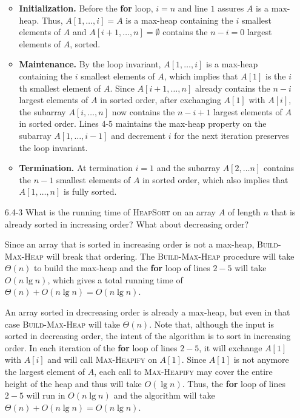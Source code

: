\documentclass{report}
\makeatletter
\renewenvironment{framed}{%
 \def\FrameCommand##1{\hskip\@totalleftmargin
 \fboxsep=\FrameSep\fbox{##1}}%
 \MakeFramed {\advance\hsize-\width
   \@totalleftmargin\z@ \linewidth\hsize
   \@setminipage}}%
 {\par\unskip\endMakeFramed}
\makeatother
\begin{document}
\begin{enumerate}
\begin{framed}
\begin{itemize}
  \item \textbf{Initialization.} Before the \textbf{for} loop, $i = n$ and line
    $1$ assures $A$ is a max-heap. Thus, $A[1, \dots, i] = A$ is a max-heap
    containing the $i$ smallest elements of $A$ and
    $A[i + 1, \dots, n] = \emptyset$ contains the $n - i = 0$ largest elements
    of $A$, sorted.
  \item \textbf{Maintenance.} By the loop invariant, $A[1, \dots, i]$ is
    a max-heap containing the $i$ smallest elements of $A$, which implies that
    $A[1]$ is the $i$th smallest element of $A$. Since $A[i + 1, \dots, n]$
    already contains the $n - i$ largest elements of $A$ in sorted order, after
    exchanging $A[1]$ with $A[i]$, the subarray $A[i, \dots, n]$ now contains
    the $n - i + 1$ largest elements of $A$ in sorted order. Lines 4-5 maintains
    the max-heap property on the subarray $A[1, \dots, i - 1]$ and decrement $i$
    for the next iteration preserves the loop invariant.
  \item \textbf{Termination.} At termination $i = 1$ and the subarray
    $A[2, \dots n]$ contains the $n - 1$ smallest elements of $A$ in sorted
    order, which also implies that $A[1, \dots, n]$ is fully sorted.
\end{itemize}
\end{framed}

\newpage

\item[6.4-3]{What is the running time of \textsc{HeapSort} on an array $A$ of
length $n$ that is already sorted in increasing order? What about decreasing
order?}

\begin{framed}
Since an array that is sorted in increasing order is not a max-heap,
\textsc{Build-Max-Heap} will break that ordering. The \textsc{Build-Max-Heap}
procedure will take $\Theta(n)$ to build the max-heap and the \textbf{for} loop
of lines $2{-}5$ will take $O(n \lg n)$, which gives a total running time of
$\Theta(n) + O(n \lg n) = O(n \lg n)$.

An array sorted in drecreasing order is already a max-heap, but even in that
case \textsc{Build-Max-Heap} will take $\Theta(n)$. Note that, although the
input is sorted in decreasing order, the intent of the algorithm is to sort in
increasing order. In each iteration of the \textbf{for} loop of lines $2{-}5$,
it will exchange $A[1]$ with $A[i]$ and will call \textsc{Max-Heapify} on
$A[1]$. Since $A[1]$ is not anymore the largest element of $A$, each call to
\textsc{Max-Heapify} may cover the entire height of the heap and thus will take
$O(\lg n)$. Thus, the \textbf{for} loop of lines $2{-}5$ will run in
$O(n \lg n)$ and the algorithm will take $\Theta(n) + O(n \lg n) = O(n \lg n)$.
\end{framed}


\end{enumerate}
\end{document}
